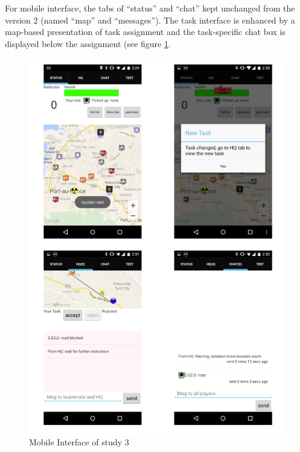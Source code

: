 For mobile interface, the tabs of ``status'' and ``chat'' kept unchanged from the version 2 (named ``map'' and ``messages''). The task interface is enhanced by a map-based presentation of task assignment and the task-specific chat box is displayed below the assignment (see figure \ref{fig:study3interfacemobile}.

\begin{figure}[H]
  \centering
  \includegraphics[width=1\textwidth]{img/conclusion/study3interfaceMobile}
  \caption{Mobile Interface of study 3}
  \label{fig:study3interfacemobile}
\end{figure}



